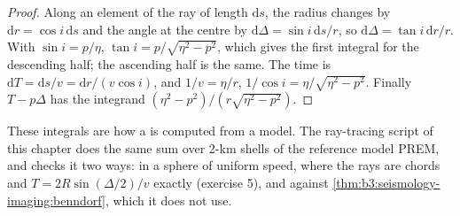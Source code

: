 \begin{proof}
Along an element of the ray of length $\mathrm ds$, the radius changes by
$\mathrm dr = \cos i\,\mathrm ds$ and the angle at the centre by
$\mathrm d\Delta = \sin i\,\mathrm ds/r$, so $\mathrm d\Delta = \tan i\,\mathrm dr/r$.
With $\sin i = p/\eta$, $\tan i = p/\sqrt{\eta^2 - p^2}$, which gives the first
integral for the descending half; the ascending half is the same. The time is
$\mathrm dT = \mathrm ds/v = \mathrm dr/(v\cos i)$, and $1/v = \eta/r$,
$1/\cos i = \eta/\sqrt{\eta^2 - p^2}$. Finally $T - p\Delta$ has the integrand
$(\eta^2 - p^2)/(r\sqrt{\eta^2 - p^2})$.
\end{proof}

These integrals are how a  is computed from a model. The
ray-tracing script of this chapter does the same sum over 2-km shells of the
reference model PREM, %
and checks it two ways: in a sphere of uniform speed, where the rays are
chords and $T = 2R\sin(\Delta/2)/v$ exactly (exercise 5), and against
\cref{thm:b3:seismology-imaging:benndorf}, which it does not use.

